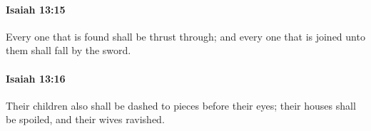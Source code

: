 		\paragraph{Isaiah 13:15} %
			\label{ISAIAH-13-15}

			Every one that is found shall be thrust through; and every one that is joined unto them shall fall by the sword.


		\paragraph{Isaiah 13:16} %
			\label{ISAIAH-13-16}

			Their children also shall be dashed to pieces before their eyes; their houses shall be spoiled, and their wives ravished.


